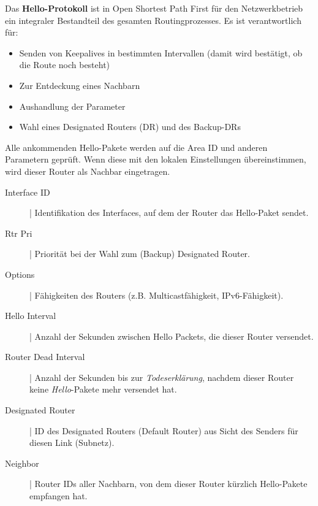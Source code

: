 \documentclass{article} %
\begin{document}
\frqq Das \textbf{Hello-Protokoll} ist in Open Shortest Path First für den Netzwerkbetrieb ein integraler Bestandteil des gesamten Routingprozesses. Es ist verantwortlich für:
\begin{multicols}{2}
	\begin{itemize}
		\item Senden von Keepalives in bestimmten Intervallen (damit wird bestätigt, ob die Route noch besteht)
		\item Zur Entdeckung eines Nachbarn
		\item Aushandlung der Parameter
		\item Wahl eines Designated Routers (DR) und des Backup-DRs
	\end{itemize}
\end{multicols}
Alle ankommenden Hello-Pakete werden auf die Area ID und anderen Parametern geprüft. Wenn diese mit den lokalen Einstellungen übereinstimmen, wird dieser Router als Nachbar eingetragen.\flqq\cite{wiki:ospf}

\begin{description}
	\item[Interface ID] | Identifikation des Interfaces, auf dem der Router das Hello-Paket sendet.
	\item[Rtr Pri] | Priorität bei der Wahl zum (Backup) Designated Router.
	\item[Options] | Fähigkeiten des Routers (z.B. Multicastfähigkeit, IPv6-Fähigkeit).
	\item[Hello Interval] | Anzahl der Sekunden zwischen Hello Packets, die dieser
		Router versendet.
	\item[Router Dead Interval] | Anzahl der Sekunden bis zur \emph{Todeserklärung}, nachdem dieser Router keine \emph{Hello}-Pakete mehr versendet hat.
	\item[Designated Router] | ID des Designated Routers (Default Router) aus Sicht des Senders für diesen Link (Subnetz).
	\item[Neighbor] | Router IDs aller Nachbarn, von dem dieser Router kürzlich
		Hello-Pakete empfangen hat.
\end{description}
\end{document}
